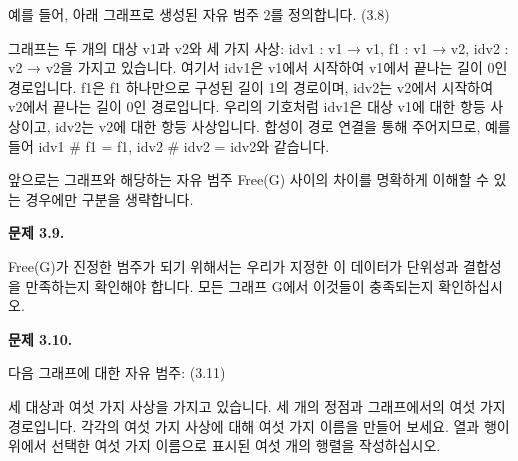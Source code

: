 \documentclass[11pt, a4paper, twoside, openany]{book}
\begin{document}
{\par\medskip
예를 들어, 아래 그래프로 생성된 자유 범주 2\hspace{0pt}를 정의합니다.
(3.8)

\par\medskip
그래프는 두 개의 대상 v1\hspace{0pt}과 v2\hspace{0pt}와 세 가지 사상: idv1 : v1 → v1, f1 : v1 → v2, idv2 : v2 → v2\hspace{0pt}을 가지고 있습니다. 여기서 idv1\hspace{0pt}은 v1\hspace{0pt}에서 시작하여 v1\hspace{0pt}에서 끝나는 길이 0\hspace{0pt}인 경로입니다. f1\hspace{0pt}은 f1 하나만으로 구성된 길이 1\hspace{0pt}의 경로이며, idv2\hspace{0pt}는 v2\hspace{0pt}에서 시작하여 v2\hspace{0pt}에서 끝나는 길이 0\hspace{0pt}인 경로입니다. 우리의 기호처럼 idv1\hspace{0pt}은 대상 v1\hspace{0pt}에 대한 항등 사상이고, idv2\hspace{0pt}는 v2\hspace{0pt}에 대한 항등 사상입니다. 합성이 경로 연결을 통해 주어지므로, 예를 들어 idv1 \# f1 = f1, idv2 \# idv2 = idv2\hspace{0pt}와 같습니다.

\par\medskip
앞으로는 그래프와 해당하는 자유 범주 Free(G) 사이의 차이를 명확하게 이해할 수 있는 경우에만 구분을 생략합니다.

\par\medskip
\textbf{문제 3.9.}

\par\medskip
Free(G)가 진정한 범주가 되기 위해서는 우리가 지정한 이 데이터가 단위성과 결합성을 만족하는지 확인해야 합니다. 모든 그래프 G\hspace{0pt}에서 이것들이 충족되는지 확인하십시오.

\par\medskip
\textbf{문제 3.10.}

\par\medskip
다음 그래프에 대한 자유 범주:
(3.11)

\par\medskip
세 대상과 여섯 가지 사상을 가지고 있습니다. 세 개의 정점과 그래프에서의 여섯 가지 경로입니다. 각각의 여섯 가지 사상에 대해 여섯 가지 이름을 만들어 보세요. 열과 행이 위에서 선택한 여섯 가지 이름으로 표시된 여섯 개의 행렬을 작성하십시오.

}
\end{document}

